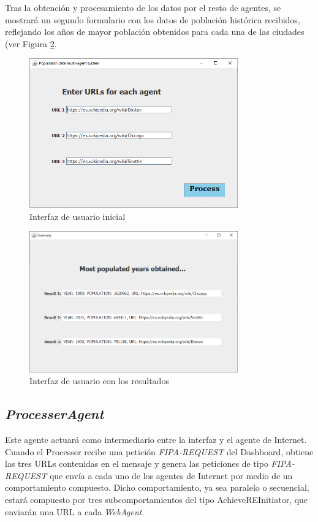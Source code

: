 \documentclass{estilo}
\begin{document}
    Tras la obtención y procesamiento de los datos por el resto de agentes, se mostrará un segundo formulario con los datos de población histórica recibidos, reflejando los años de mayor población obtenidos para cada una de las ciudades (ver Figura \ref{fig:fig6}.
    
      \vfill
    \begin{figure} [ht]
        \centering
        \includegraphics[width=9cm]{images/url_selection_window.PNG}
        \caption{Interfaz de usuario inicial}
        \label{fig:fig5}
    \end{figure}
    \vfill
    
    \vfill
    \begin{figure} [ht]
        \centering
        \includegraphics[width=9cm]{images/summary_window.PNG}
        \caption{Interfaz de usuario con los resultados}
        \label{fig:fig6}
    \end{figure}
    \vfill
    
    \subsection{\textit{ProcesserAgent}}
    Este agente actuará como intermediario entre la interfaz y el agente de Internet. Cuando el Processer recibe una petición \textit{FIPA-REQUEST} del Dashboard, obtiene las tres URLs contenidas en el mensaje y genera las peticiones de tipo \textit{FIPA-REQUEST} que envía a cada uno de los agentes de Internet por medio de un comportamiento compuesto. Dicho comportamiento, ya sea paralelo o secuencial, estará compuesto por tres subcomportamientos del tipo AchieveREInitiator, que enviarán una URL a cada \textit{WebAgent}. 
    
\end{document}

